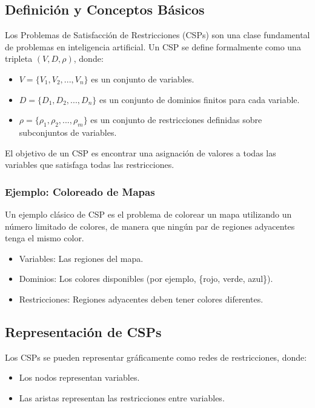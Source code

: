 \documentclass[12pt,a4paper]{report}
\begin{document}
\subsection{Definición y Conceptos Básicos}

Los Problemas de Satisfacción de Restricciones (CSPs) son una clase fundamental de problemas en inteligencia artificial. Un CSP se define formalmente como una tripleta $(V, D, \rho)$, donde:

\begin{itemize}
    \item $V = \{V_1, V_2, ..., V_n\}$ es un conjunto de variables.
    \item $D = \{D_1, D_2, ..., D_n\}$ es un conjunto de dominios finitos para cada variable.
    \item $\rho = \{\rho_1, \rho_2, ..., \rho_m\}$ es un conjunto de restricciones definidas sobre subconjuntos de variables.
\end{itemize}

El objetivo de un CSP es encontrar una asignación de valores a todas las variables que satisfaga todas las restricciones. 

\subsubsection{Ejemplo: Coloreado de Mapas}
Un ejemplo clásico de CSP es el problema de colorear un mapa utilizando un número limitado de colores, de manera que ningún par de regiones adyacentes tenga el mismo color.

\begin{itemize}
    \item Variables: Las regiones del mapa.
    \item Dominios: Los colores disponibles (por ejemplo, \{rojo, verde, azul\}).
    \item Restricciones: Regiones adyacentes deben tener colores diferentes.
\end{itemize}

\subsection{Representación de CSPs}

Los CSPs se pueden representar gráficamente como redes de restricciones, donde:

\begin{itemize}
    \item Los nodos representan variables.
    \item Las aristas representan las restricciones entre variables.
\end{itemize}
\end{document}
